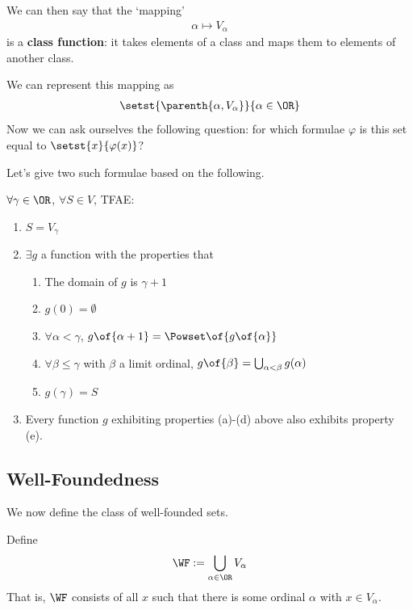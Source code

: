 We can then say that the `mapping'
\begin{align*}
    \alpha \mapsto V_{\alpha}
\end{align*}
is a \textbf{class function}: it takes elements of a class and maps them to elements of another class.

We can represent this mapping as
\begin{align*}
    \setst{\parenth{\alpha, V_{\alpha}}}{\alpha \in \OR}
\end{align*}
Now we can ask ourselves the following question: for which formulae $\varphi$ is this set equal to $\setst{x}{\varphi(x)}$?

Let's give two such formulae based on the following.

\begin{boxtheorem}
    $\forall \gamma \in \OR$, $\forall S \in V$, TFAE:
    \begin{enumerate}
        \item $S = V_{\gamma}$
        \item $\exists g$ a function with the properties that
        \begin{enumerate}[label = (\alph*)]
            \item The domain of $g$ is $\gamma + 1$
            \item $g(0) = \emptyset$
            \item $\forall \alpha < \gamma$, $g\of{\alpha + 1} = \Powset\of{g\of{\alpha}}$
            \item $\forall \beta \leq \gamma$ with $\beta$ a limit ordinal, $g\of{\beta} = \bigcup_{\alpha < \beta} g(\alpha)$
            \item $g(\gamma) = S$
        \end{enumerate}
        \item Every function $g$ exhibiting properties (a)-(d) above also exhibits property (e).
    \end{enumerate}
\end{boxtheorem}

\subsection{Well-Foundedness}

We now define the class of well-founded sets.

\begin{boxdefinition}
    Define
    \begin{align*}
        \WF := \bigcup_{\alpha \in \OR} V_{\alpha}
    \end{align*}
    That is, $\WF$ consists of all $x$ such that there is some ordinal $\alpha$ with $x \in V_{\alpha}$.
\end{boxdefinition}

